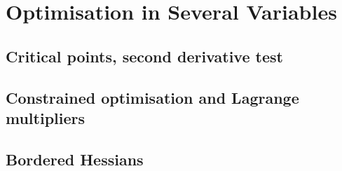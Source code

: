 
\section{Optimisation in Several Variables}

\subsection{Critical points, second derivative test}


\subsection{Constrained optimisation and Lagrange multipliers}


\subsection{Bordered Hessians}


